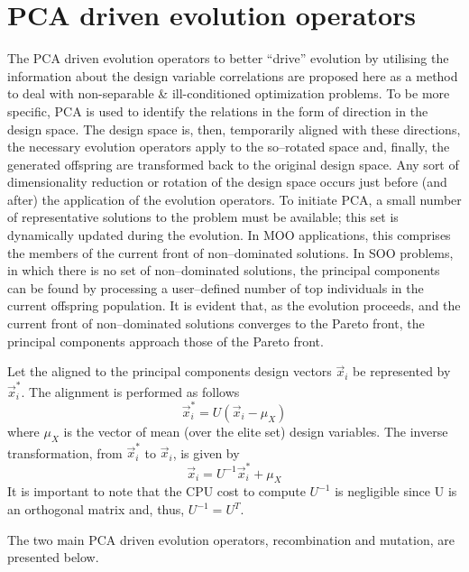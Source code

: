 \section{PCA driven evolution operators} 
The PCA driven evolution operators to better ``drive'' evolution by utilising the information about the design variable correlations are proposed here as a method to deal with non-separable \& ill-conditioned optimization problems. To be more specific, PCA is used to identify the relations in the form of direction in the design space. The design space is, then, temporarily aligned with these directions, the necessary evolution operators apply to the so--rotated space and, finally, the generated offspring are transformed back to the original design space. Any sort of dimensionality reduction or rotation of the design space occurs just before (and after) the application of the evolution operators. To initiate PCA, a small number of representative solutions to the problem must be available; this set is dynamically updated during the evolution. In MOO applications, this comprises the members of the current front of non--dominated solutions. In SOO problems, in which there is no set of non--dominated solutions, the principal components can be found by processing a user--defined number of top individuals in the current offspring population. It is evident that, as the evolution proceeds, and the current front of non--dominated solutions converges to the Pareto front, the principal components approach those of the Pareto front. 

Let the aligned to the principal components design vectors \(\vec{x}_i\) be represented by \(\vec{x}^*_i\). The alignment is performed as follows
\begin{equation} 
   \vec{x}^*_i=U(\vec{x}_i-\mu_{X})
   \label{align} %
\end{equation}
where $\mu_{X}$ is the vector of mean (over the elite set) design variables.
The inverse transformation, from $\vec{x}^*_i$ to $\vec{x}_i$, is given by
\begin{equation} 
   \vec{x}_i=U^{-1}\vec{x}^*_i+\mu_{X}
	\label{re-align}
\end{equation}
It is important to note that the CPU cost to compute \(U^{-1}\) is negligible since U is an orthogonal matrix and, thus, \(U^{-1} = U^T\). 

The two main PCA driven evolution operators, recombination and mutation, are presented below.  

\paragraph{}
